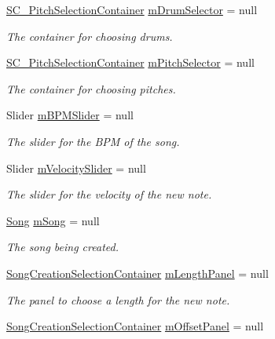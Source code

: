 \begin{DoxyCompactItemize}
\hyperlink{class_s_c___pitch_selection_container}{S\+C\+\_\+\+Pitch\+Selection\+Container} \hyperlink{group___s_c_m_priv_var_gac8be873b8259a0ddf76b4fa6d7d2d072}{m\+Drum\+Selector} = null
\begin{DoxyCompactList}\small\item\em The container for choosing drums. \end{DoxyCompactList}\item 
\hyperlink{class_s_c___pitch_selection_container}{S\+C\+\_\+\+Pitch\+Selection\+Container} \hyperlink{group___s_c_m_priv_var_gab84821120cace4099edfb42c52d2af63}{m\+Pitch\+Selector} = null
\begin{DoxyCompactList}\small\item\em The container for choosing pitches. \end{DoxyCompactList}\item 
Slider \hyperlink{group___s_c_m_priv_var_ga87ac3691ad7848394e51442f29d9659d}{m\+B\+P\+M\+Slider} = null
\begin{DoxyCompactList}\small\item\em The slider for the B\+PM of the song. \end{DoxyCompactList}\item 
Slider \hyperlink{group___s_c_m_priv_var_ga7316e5e8f15d1574fc6cb4bd739bbf0a}{m\+Velocity\+Slider} = null
\begin{DoxyCompactList}\small\item\em The slider for the velocity of the new note. \end{DoxyCompactList}\item 
\hyperlink{class_song}{Song} \hyperlink{group___s_c_m_priv_var_gabd8329149faef65a689650d951a9abc9}{m\+Song} = null
\begin{DoxyCompactList}\small\item\em The song being created. \end{DoxyCompactList}\item 
\hyperlink{group___s_c_m_nest_class_class_song_creation_manager_1_1_song_creation_selection_container}{Song\+Creation\+Selection\+Container} \hyperlink{group___s_c_m_priv_var_gadb8dedf80fbe474a1c94cdc95d088a6f}{m\+Length\+Panel} = null
\begin{DoxyCompactList}\small\item\em The panel to choose a length for the new note. \end{DoxyCompactList}\item 
\hyperlink{group___s_c_m_nest_class_class_song_creation_manager_1_1_song_creation_selection_container}{Song\+Creation\+Selection\+Container} \hyperlink{group___s_c_m_priv_var_ga86a44007a4b127d7aa61f75dd34a3409}{m\+Offset\+Panel} = null

\end{DoxyCompactItemize}
